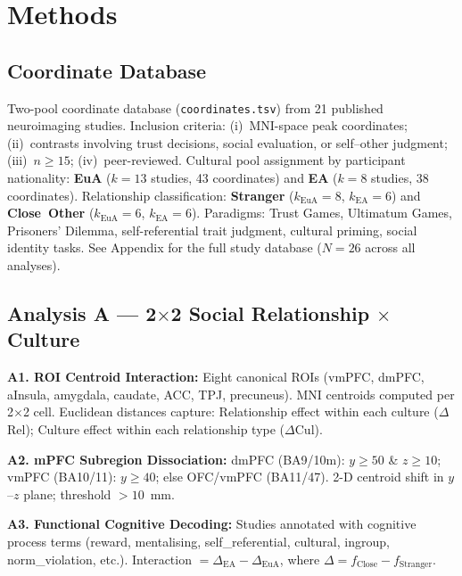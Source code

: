 \documentclass[11pt,a4paper]{report}
\begin{document}
\chapter{Methods}

\section*{Coordinate Database}

Two-pool coordinate database (\texttt{coordinates.tsv}) from 21 published neuroimaging
studies. Inclusion criteria: (i)~MNI-space peak coordinates; (ii)~contrasts involving trust
decisions, social evaluation, or self--other judgment; (iii)~$n\geq15$; (iv)~peer-reviewed.
Cultural pool assignment by participant nationality: \textcolor{euaBlue}{\textbf{EuA}}
($k=13$ studies, 43 coordinates) and \textcolor{eaRed}{\textbf{EA}} ($k=8$ studies,
38 coordinates). Relationship classification: \textbf{Stranger} ($k_{\text{EuA}}=8$,
$k_{\text{EA}}=6$) and \textbf{Close~Other} ($k_{\text{EuA}}=6$, $k_{\text{EA}}=6$).
Paradigms: Trust Games, Ultimatum Games, Prisoners' Dilemma, self-referential trait
judgment, cultural priming, social identity tasks. See Appendix for the full study database
($N=26$ across all analyses).

\section*{Analysis A --- 2$\times$2 Social Relationship $\times$ Culture}

\textbf{A1. ROI Centroid Interaction:} Eight canonical ROIs (vmPFC, dmPFC, aInsula,
amygdala, caudate, ACC, TPJ, precuneus). MNI centroids computed per 2$\times$2 cell.
Euclidean distances capture: Relationship effect within each culture ($\Delta$Rel);
Culture effect within each relationship type ($\Delta$Cul).

\textbf{A2. mPFC Subregion Dissociation:} dmPFC (BA9/10m): $y\geq50$ \& $z\geq10$;
vmPFC (BA10/11): $y\geq40$; else OFC/vmPFC (BA11/47). 2-D centroid shift in $y$--$z$
plane; threshold $>10$~mm.

\textbf{A3. Functional Cognitive Decoding:} Studies annotated with cognitive process terms
(reward, mentalising, self\_referential, cultural, ingroup, norm\_violation, etc.).
Interaction $= \Delta_{\text{EA}} - \Delta_{\text{EuA}}$, where
$\Delta = f_{\text{Close}} - f_{\text{Stranger}}$.
\end{document}
